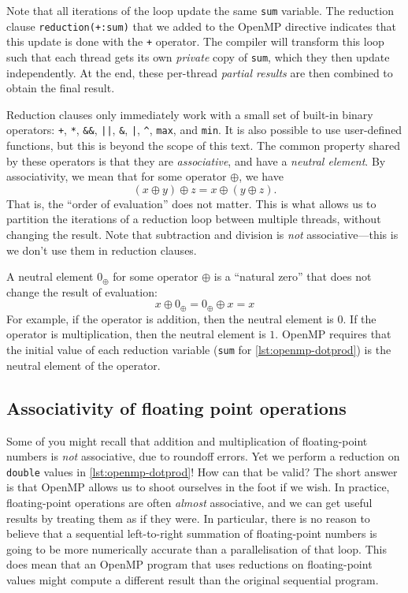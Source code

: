 Note that all iterations of the loop update the same \texttt{sum}
variable. The reduction clause \texttt{reduction(+:sum)} that we added
to the OpenMP directive indicates that this update is done with the
\lstinline{+} operator. The compiler will transform this loop such
that each thread gets its own \emph{private} copy of \texttt{sum},
which they then update independently. At the end, these per-thread
\emph{partial results} are then combined to obtain the final result.

Reduction clauses only immediately work with a small set of built-in
binary operators: \lstinline{+}, \lstinline{*},
\lstinline{&&}, \lstinline{||}, \lstinline{&}, \lstinline{|},
\lstinline{^}, \lstinline{max}, and \lstinline{min}.  It is also
possible to use user-defined functions, but this is beyond the scope
of this text.  The common property shared by these operators is that
they are \emph{associative}, and have a \emph{neutral element}.  By
associativity, we mean that for some operator $\oplus$, we have
\[
  (x \oplus y) \oplus z = x \oplus (y \oplus z).
\]
That is, the ``order of evaluation'' does not matter. This is what
allows us to partition the iterations of a reduction loop between
multiple threads, without changing the result. Note that subtraction
and division is \emph{not} associative---this is we don't use them in
reduction clauses.

A neutral element $0_{\oplus}$ for some operator $\oplus$ is a
``natural zero'' that does not change the result of evaluation:
\[
  x \oplus 0_{\oplus} = 0_{\oplus} \oplus x = x
\]
For example, if the operator is addition, then the neutral element is
$0$.  If the operator is multiplication, then the neutral element is
$1$.  OpenMP requires that the initial value of each reduction
variable (\lstinline{sum} for \cref{lst:openmp-dotprod}) is the
neutral element of the operator.

\subsection{Associativity of floating point operations}

Some of you might recall that addition and multiplication of
floating-point numbers is \emph{not} associative, due to roundoff
errors.  Yet we perform a reduction on \lstinline{double} values in
\cref{lst:openmp-dotprod}!  How can that be valid?  The short answer
is that OpenMP allows us to shoot ourselves in the foot if we wish.
In practice, floating-point operations are often \emph{almost}
associative, and we can get useful results by treating them as if they
were.  In particular, there is no reason to believe that a sequential
left-to-right summation of floating-point numbers is going to be more
numerically accurate than a parallelisation of that loop.  This does
mean that an OpenMP program that uses reductions on floating-point
values might compute a different result than the original sequential
program.

